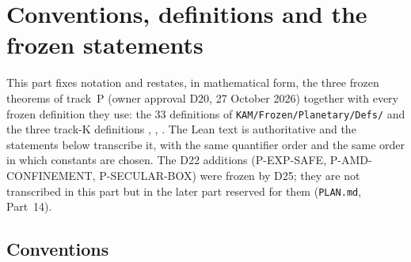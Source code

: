 \section{Conventions, definitions and the frozen statements}\label{bpP:p0}

This part fixes notation and restates, in mathematical form, the three frozen theorems of track~P
(owner approval D20, 27 October 2026) together with every frozen definition they use: the $33$ definitions of
\texttt{KAM/Frozen/Planetary/Defs/} and the three track-K definitions ,
, . The Lean text is authoritative and the statements
below transcribe it, with the same quantifier order and the same order in which constants are chosen. The D22
additions (P-EXP-SAFE, P-AMD-CONFINEMENT, P-SECULAR-BOX) were frozen by D25; they are not transcribed in this part but
in the later part reserved for them (\texttt{PLAN.md}, Part~14).

\subsection{Conventions}\label{bpP:p0:conventions}

